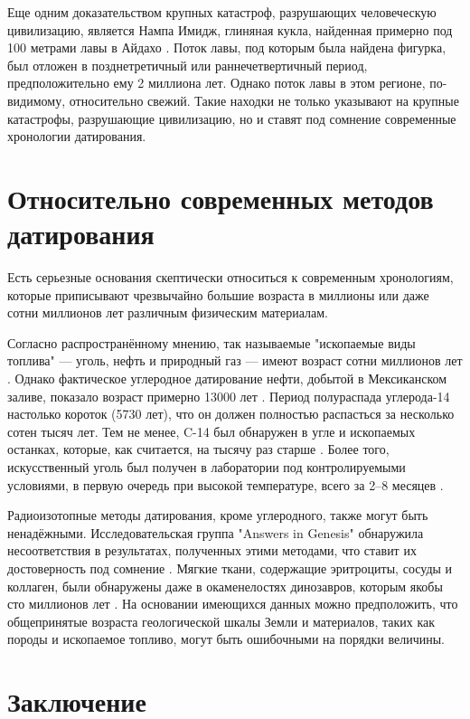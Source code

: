 \documentclass[10pt,twocolumn,letterpaper]{article}
\begin{document}
Еще одним доказательством крупных катастроф, разрушающих человеческую цивилизацию, является Нампа Имидж, глиняная кукла, найденная примерно под 100 метрами лавы в Айдахо \cite{102,103}. Поток лавы, под которым была найдена фигурка, был отложен в позднетретичный или раннечетвертичный период, предположительно ему 2 миллиона лет. Однако поток лавы в этом регионе, по-видимому, относительно свежий. Такие находки не только указывают на крупные катастрофы, разрушающие цивилизацию, но и ставят под сомнение современные хронологии датирования.

\section{Относительно современных методов датирования}

Есть серьезные основания скептически относиться к современным хронологиям, которые приписывают чрезвычайно большие возраста в миллионы или даже сотни миллионов лет различным физическим материалам.

Согласно распространённому мнению, так называемые "ископаемые виды топлива" — уголь, нефть и природный газ — имеют возраст сотни миллионов лет \cite{104}. Однако фактическое углеродное датирование нефти, добытой в Мексиканском заливе, показало возраст примерно 13000 лет \cite{105}. Период полураспада углерода-14 настолько короток (5730 лет), что он должен полностью распасться за несколько сотен тысяч лет. Тем не менее, C-14 был обнаружен в угле и ископаемых останках, которые, как считается, на тысячу раз старше \cite{106}. Более того, искусственный уголь был получен в лаборатории под контролируемыми условиями, в первую очередь при высокой температуре, всего за 2–8 месяцев \cite{107}.

Радиоизотопные методы датирования, кроме углеродного, также могут быть ненадёжными. Исследовательская группа "Answers in Genesis" обнаружила несоответствия в результатах, полученных этими методами, что ставит их достоверность под сомнение \cite{108}. Мягкие ткани, содержащие эритроциты, сосуды и коллаген, были обнаружены даже в окаменелостях динозавров, которым якобы сто миллионов лет \cite{109,110}. На основании имеющихся данных можно предположить, что общепринятые возраста геологической шкалы Земли и материалов, таких как породы и ископаемое топливо, могут быть ошибочными на порядки величины.

\section{Заключение}
\end{document}
